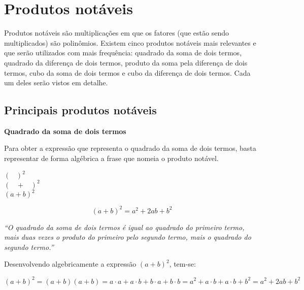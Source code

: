 	\section{Produtos notáveis}
	
	Produtos notáveis são multiplicações em que os fatores (que estão sendo multiplicados) são polinômios. Existem cinco produtos notáveis mais relevantes e que serão utilizados com mais frequência: quadrado da soma de dois termos, quadrado da diferença de dois termos, produto da soma pela diferença de dois termos, cubo da soma de dois termos e cubo da diferença de dois termos. Cada um deles serão vistos em detalhe.\\
	\subsection{Principais produtos notáveis}

    \noindent
	\textbf{Quadrado da soma de dois termos}
	
	Para obter a expressão que representa o quadrado da soma de dois termos, basta representar de forma algébrica a frase que nomeia o produto notável.    

        \begin{tcolorbox}[colback=white,colframe=minha_cor,coltitle=black,title=Quadrado da soma de dois termos] 
        \centering
         $( \;\;\;)^2$ \\[0.25cm]
         $(\;\;\;+\;\;\;)^2$ \\[0.25cm]
         $( a + b )^2$ 
        \end{tcolorbox}
	
	\[
	( a + b )^2 = a^2 + 2ab + b^2
	\]
	
	\textit{“O quadrado da soma de dois termos é igual ao quadrado do primeiro termo, mais duas vezes o produto do primeiro pelo segundo termo, mais o quadrado do segundo termo.''}
	
	Desenvolvendo algebricamente a expressão $( a + b )^2$, tem-se:
	
	\[
	( a + b )^2 = ( a + b )( a + b ) = a \cdot a + a \cdot b + b \cdot a + b \cdot b = a^2 + a \cdot b + a \cdot b + b^2 = a^2 + 2ab + b^2
	\]


        \begin{texample}
        \centering
        \end{texample}

